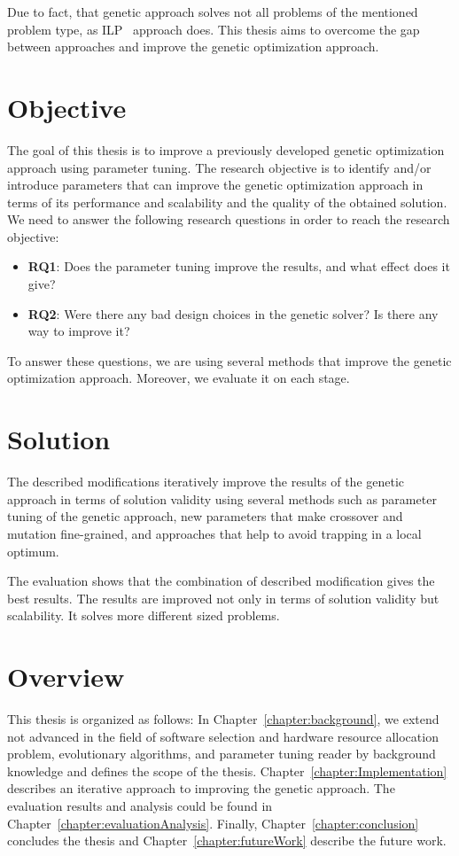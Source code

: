 Due to fact, that genetic approach solves not all problems of the mentioned problem type, as ILP~\cite{gotz18} approach does.
This thesis aims to overcome the gap between approaches and improve the genetic optimization approach.


\section{Objective}
The goal of this thesis is to improve a previously developed genetic optimization approach using parameter tuning.
The research objective is to identify and/or introduce parameters that can improve the genetic optimization approach in terms of its performance and scalability and the quality of the obtained solution. We need to answer the following research questions in order to reach the research objective: 
\begin{itemize}
	\item \textbf{RQ1}: Does the parameter tuning improve the results, and what effect does it give?
	\item \textbf{RQ2}: Were there any bad design choices in the genetic solver? Is there any way to improve it?
\end{itemize}

To answer these questions, we are using several methods that improve the genetic optimization approach. Moreover, we evaluate it on each stage. 

\section{Solution}

The described modifications iteratively improve the results of the genetic approach in terms of solution validity using several methods such as parameter tuning of the genetic approach, new parameters that make crossover and mutation fine-grained, and approaches that help to avoid trapping in a local optimum.

The evaluation shows that the combination of described modification gives the best results. The results are improved not only in terms of solution validity but scalability. It solves more different sized problems. 


\section{Overview}
This thesis is organized as follows: In Chapter~\ref{chapter:background}, we extend not advanced in the field of software selection and hardware resource allocation problem, evolutionary algorithms, and parameter tuning reader by background knowledge and defines the scope of the thesis. Chapter~\ref{chapter:Implementation} describes an iterative approach to improving the genetic approach. The evaluation results and analysis could be found in Chapter~\ref{chapter:evaluationAnalysis}. Finally, Chapter~\ref{chapter:conclusion} concludes the thesis and Chapter~\ref{chapter:futureWork} describe the future work.
